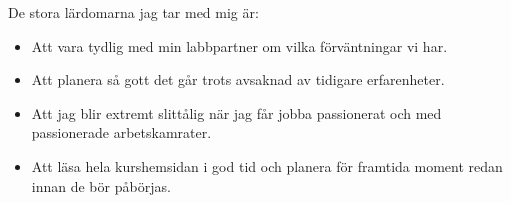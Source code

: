 \documentclass{TDP005mall}
\begin{document}
De stora lärdomarna jag tar med mig är:
\begin{itemize}
\item Att vara tydlig med min labbpartner om vilka förväntningar vi har.
\item Att planera så gott det går trots avsaknad av tidigare erfarenheter.
\item Att jag blir extremt slittålig när jag får jobba passionerat och med passionerade arbetskamrater.
\item Att läsa hela kurshemsidan i god tid och planera för framtida moment redan innan de bör påbörjas.
\end{itemize}
\end{document}

